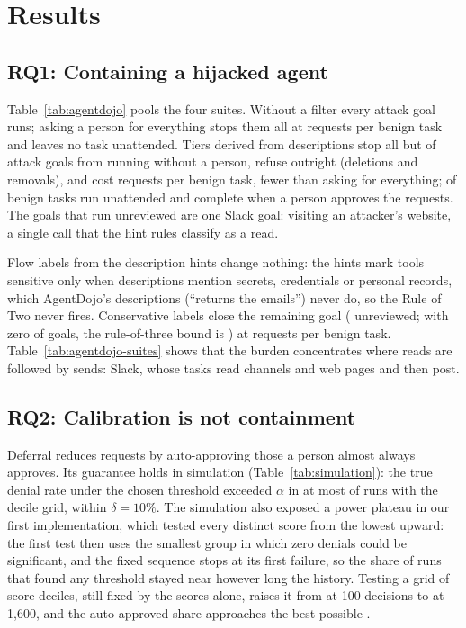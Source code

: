 \section{Results}
\label{sec:results}



\subsection{RQ1: Containing a hijacked agent}
\label{sec:res-agentdojo}
Table~\ref{tab:agentdojo} pools the four suites. Without a filter every attack goal runs; asking a person for everything stops them all at \AdAskAsks{} requests per benign task and leaves no task unattended. Tiers derived from descriptions stop all but \AdTiersGoalUnreviewed{} \AdTiersGoalUnreviewedCI{} of attack goals from running without a person, refuse \AdTiersGoalDenied{} outright (deletions and removals), and cost \AdTiersAsks{} \AdTiersAsksCI{} requests per benign task, \AdAskReduction{} fewer than asking for everything; \AdTiersUnattended{} of benign tasks run unattended and \AdTiersCompletes{} complete when a person approves the requests. The goals that run unreviewed are one Slack goal: visiting an attacker's website, a single \AdTiersUnreviewedGoalTool{} call that the hint rules classify as a read.

Flow labels from the description hints change nothing: the hints mark tools sensitive only when descriptions mention secrets, credentials or personal records, which AgentDojo's descriptions (``returns the emails'') never do, so the Rule of Two never fires. Conservative labels close the remaining goal (\AdConsGoalUnreviewed{} unreviewed; with zero of \AdGoals{} goals, the rule-of-three bound is \AdRuleOfThree{}) at \AdConsAsks{} \AdConsAsksCI{} requests per benign task. Table~\ref{tab:agentdojo-suites} shows that the burden concentrates where reads are followed by sends: Slack, whose tasks read channels and web pages and then post.



\subsection{RQ2: Calibration is not containment}
\label{sec:res-deferral}

Deferral reduces requests by auto-approving those a person almost always approves. Its guarantee holds in simulation (Table~\ref{tab:simulation}): the true denial rate under the chosen threshold exceeded $\alpha$ in at most \SimDecMaxViolation{} of runs with the decile grid, within $\delta = 10\%$. The simulation also exposed a power plateau in our first implementation, which tested every distinct score from the lowest upward: the first test then uses the smallest group in which zero denials could be significant, and the fixed sequence stops at its first failure, so the share of runs that found any threshold stayed near \SimEveryReadySixteenHundred{} however long the history. Testing a grid of score deciles, still fixed by the scores alone, raises it from \SimDecReadyHundred{} at 100 decisions to \SimDecReadySixteenHundred{} at 1{,}600, and the auto-approved share approaches the best possible \SimOptimal{}.

